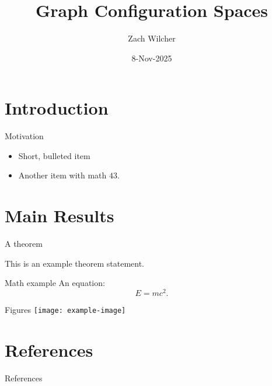 \documentclass{beamer}
\title{Graph Configuration Spaces}
\author{Zach Wilcher}
\institute{Ball State University}
\date{8-Nov-2025}
\begin{document}



\section{Introduction}
\begin{frame}{Motivation}
  \begin{itemize}
    \item Short, bulleted item
    \item Another item with math \(43\).
  \end{itemize}
\end{frame}

\section{Main Results}
\begin{frame}{A theorem}
  \begin{theorem}
    This is an example theorem statement.
  \end{theorem}
\end{frame}

\begin{frame}{Math example}
  An equation:
  \[ E = mc^2. \]
\end{frame}

\begin{frame}{Figures}
  \centering
  \texttt{[image: example-image]}
\end{frame}

\section{References}
\begin{frame}[allowframebreaks]{References}
  \printbibliography
\end{frame}
\end{document}
